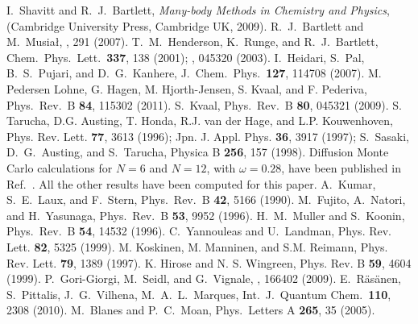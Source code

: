 \documentclass[10pt]{revtex4}
\begin{document}
\begin{thebibliography}{200}
 I.~Shavitt and R.\ J.\ Bartlett, {\em Many-body Methods in Chemistry and Physics},  
(Cambridge University Press, Cambridge UK, 2009). 
 R.\ J.\ Bartlett and M.\ Musia{\l}, , 291 (2007).
 T.~M.~Henderson, K.~Runge, and R.~J.~Bartlett, Chem.~Phys.~Lett.~{\bf 337}, 138 (2001); , 045320 (2003).
 I.~Heidari, S.~Pal, B.~S.~Pujari, and D.~G.~Kanhere, J.~Chem.~Phys.~{\bf 127}, 
114708 (2007).
 M. Pedersen Lohne, G. Hagen, M. Hjorth-Jensen, S. Kvaal, and F. Pederiva, Phys.~Rev.~B {\bf 84}, 115302 (2011).
 S.~Kvaal, Phys.~Rev.~B {\bf 80}, 045321 (2009).
 S. Tarucha, D.G. Austing, T. Honda, R.J. van der Hage, and L.P. Kouwenhoven,
Phys. Rev. Lett. {\bf 77}, 3613 (1996); Jpn. J. Appl. Phys. {\bf 36}, 3917 (1997);
S.~Sasaki, D.~G.~Austing, and S.~Tarucha, Physica B {\bf 256}, 157 (1998).
Diffusion Monte Carlo  
calculations for $N=6$ and $N=12$, with $\omega=0.28$,
have been published in Ref.~. All the other 
results have been computed for this paper.
 A.~Kumar, S.~E.~Laux, and F.~Stern, Phys.~Rev.~B {\bf 42}, 5166 (1990).
 M.~Fujito, A.~Natori, and H.~Yasunaga, Phys.~Rev.~B {\bf 53}, 9952 (1996).
 H.~M.~Muller and S.~Koonin, Phys.~Rev.~B {\bf 54}, 14532 (1996).
 C.~Yannouleas and U.~Landman, Phys. Rev. Lett. {\bf 82}, 5325 (1999).
 M. Koskinen, M. Manninen, and S.M. Reimann, Phys. Rev. Lett. {\bf 79}, 1389 (1997).
 K. Hirose and N. S. Wingreen, Phys. Rev. B {\bf 59}, 4604 (1999).
 P.~Gori-Giorgi, M.~Seidl, and G.~Vignale, , 166402 (2009).
 E.~R\"as\"anen, S.~Pittalis, J.~G.~Vilhena, M.~A.~L.~Marques, Int.~J.~Quantum Chem.~{\bf 110}, 2308 (2010). 
 M.~Blanes and P.~C.~Moan, Phys.~Letters A {\bf 265}, 35 (2005).
\end{thebibliography}
\end{document}

